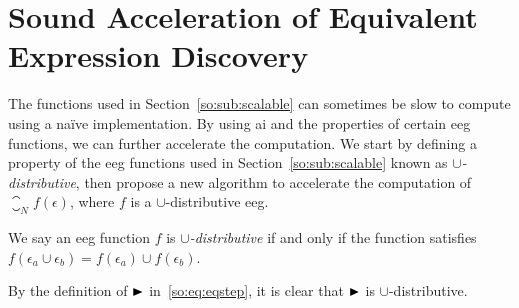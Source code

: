 \chapter{Sound Acceleration of Equivalent Expression Discovery}
\label{app:sound_acceleration}

The functions used in Section~\ref{so:sub:scalable} can sometimes be slow
to compute using a na\"ive implementation.  By using \acrlong{ai} and the
properties of certain \acrfull{eeg} functions, we can further accelerate the
computation.  We start by defining a property of the \gls{eeg} functions
used in Section~\ref{so:sub:scalable} known as \emph{$\cup$-distributive},
then propose a new algorithm to accelerate the computation of $\closure_N f
(\epsilon)$, where $f$ is a $\cup$-distributive \gls{eeg}\@.
\begin{definition}
    We say an \gls{eeg} function $f$ is \emph{$\cup$-distributive} if and only
    if the function satisfies $f(\epsilon_a \cup \epsilon_b) = f(\epsilon_a)
    \cup f(\epsilon_b)$.
\end{definition}
\begin{corollary}
    By the definition of $\operatorname{\blacktriangleright}$ in~\eqref{so:eq:eqstep}, it is clear that
    $\operatorname{\blacktriangleright}$ is $\cup$-distributive.
    {}\label{so:cor:union}
\end{corollary}

